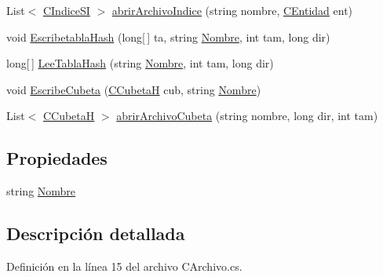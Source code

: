 \begin{DoxyCompactItemize}
\item 
List$<$ \hyperlink{class_diccionario_1_1_c_indice_s_i}{C\-Indice\-S\-I} $>$ \hyperlink{class_diccionario_1_1_c_archivo_af9ef6c651134c8312d7929d63ceb3bdd}{abrir\-Archivo\-Indice} (string nombre, \hyperlink{class_diccionario_1_1_c_entidad}{C\-Entidad} ent)
\item 
void \hyperlink{class_diccionario_1_1_c_archivo_a005d9d4a71e1a563c5305d795554cb35}{Escribetabla\-Hash} (long\mbox{[}$\,$\mbox{]} ta, string \hyperlink{class_diccionario_1_1_c_archivo_ae35f848874ff23f326c7fdbd5cc62f30}{Nombre}, int tam, long dir)
\item 
long\mbox{[}$\,$\mbox{]} \hyperlink{class_diccionario_1_1_c_archivo_ad50614f8f77c4d6e732e01e72fc5f344}{Lee\-Tabla\-Hash} (string \hyperlink{class_diccionario_1_1_c_archivo_ae35f848874ff23f326c7fdbd5cc62f30}{Nombre}, int tam, long dir)
\item 
void \hyperlink{class_diccionario_1_1_c_archivo_a0502d7e0f3ba5a400aa54980dfb590bd}{Escribe\-Cubeta} (\hyperlink{class_diccionario_1_1_c_cubeta_h}{C\-Cubeta\-H} cub, string \hyperlink{class_diccionario_1_1_c_archivo_ae35f848874ff23f326c7fdbd5cc62f30}{Nombre})
\item 
List$<$ \hyperlink{class_diccionario_1_1_c_cubeta_h}{C\-Cubeta\-H} $>$ \hyperlink{class_diccionario_1_1_c_archivo_a71220f2aa24599fda8436e8d502e8a8f}{abrir\-Archivo\-Cubeta} (string nombre, long dir, int tam)
\end{DoxyCompactItemize}
\subsection*{Propiedades}
\begin{DoxyCompactItemize}
\item 
string \hyperlink{class_diccionario_1_1_c_archivo_ae35f848874ff23f326c7fdbd5cc62f30}{Nombre}
\end{DoxyCompactItemize}


\subsection{Descripción detallada}


Definición en la línea 15 del archivo C\-Archivo.\-cs.



